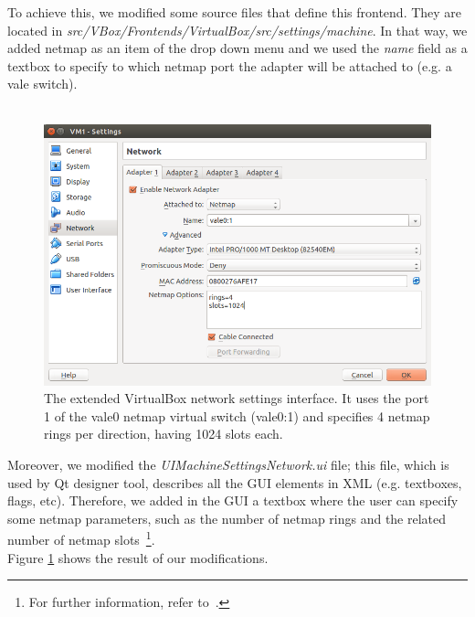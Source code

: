 \documentclass[a4paper, 12pt, titlepage]{report}
\begin{document}
To achieve this, we modified some source files that define this frontend. They are located in \textit{src/VBox/Frontends/VirtualBox/src/settings/machine}. In that way, we added netmap as an item of the drop down menu and we used the \textit{name} field as a textbox to specify to which netmap port the adapter will be attached to (e.g. a vale switch).\\\\\begin{figure}[t] 
	\centering
	\includegraphics[width=\textwidth]{img/netmap_settings.png}
	\caption{The extended VirtualBox network settings interface. It uses the port 1 of the vale0 netmap virtual switch (vale0:1) and specifies 4 netmap rings per direction, having 1024 slots each.}
	\label{img:netmap_settings}
\end{figure}Moreover, we modified the \textit{UIMachineSettingsNetwork.ui} file; this file, which is used by Qt designer tool, describes all the GUI elements in XML (e.g. textboxes, flags, etc). Therefore, we added in the GUI a textbox where the user can specify some netmap parameters, such as the number of netmap rings and the related number of netmap slots~\footnote{For further information, refer to~\cite{netmap}.}.
\\
Figure \ref{img:netmap_settings} shows the result of our modifications.
\end{document}
